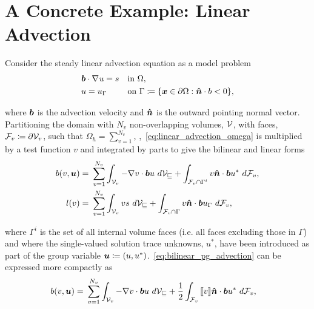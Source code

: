 \section{A Concrete Example: Linear Advection}

Consider the steady linear advection equation as a model problem
\begin{subequations}
\begin{align}
& \varv{b} \cdot \nabla \vars{u} = s && \text{in}\ \Omega, \label{eq:linear_advection_omega} \\
& u = u_{\Gamma}\ && \text{on}\ \Gamma \coloneqq \{ \varv{x} \in \partial\Omega : \varv{\hat{n}} \cdot b < 0 \},
\end{align}
\end{subequations}

where $\mathit{\bm{{b}}}$ is the advection velocity and $\mathit{\bm{{\hat{n}}}}$ is the outward pointing normal vector. Partitioning the
domain with $N_v$ non-overlapping volumes, $\mathcal{{{V}}}$, with faces, $\mathcal{{{F}}}_v \coloneqq \partial \mathcal{{{V}}}_v$, such that
$\Omega_h = \sum_{v=1}^{N_v}$, ,~\eqref{eq:linear_advection_omega} is multiplied
by a test function $v$ and integrated by parts to give the bilinear and linear forms
\begin{subequations} \label{eq:variational_form_advection}
\begin{align}
b(v,\varg{u}) 
=\ & \sum_{v=1}^{N_v} \int_{\fe{V}_v} - \nabla v \cdot \varv{b} u\ d\fe{V_v} + \int_{\fe{F}_v \cap \Gamma^i} v
\varv{\hat{n}} \cdot \varv{b} u^*\ d\fe{F}_v, \label{eq:bilinear_pg_advection}\\
l(v)
=\ & \sum_{v=1}^{N_v} \int_{\fe{V}_v} v s\ d\fe{V_v} + \int_{\fe{F}_v \cap \Gamma} v \varv{\hat{n}} \cdot \varv{b}
u_{\Gamma}\ d\fe{F}_v,
\end{align}
\end{subequations}

where $\Gamma^i$ is the set of all internal volume faces (i.e. all faces excluding those in $\Gamma$) and where the
single-valued solution trace unknowns, $u^*$, have been introduced as part of the group variable $\mathit{\bm{{u}}} \coloneqq
(u,u^*)$.~\eqref{eq:bilinear_pg_advection} can be expressed more compactly as
\begin{align} \label{eq:bilinear_pg_advection_jump}
b(v,\varg{u}) 
=\ & \sum_{v=1}^{N_v} \int_{\fe{V}_v} - \nabla v \cdot \varv{b} u\ d\fe{V_v}
+ \frac{1}{2} \int_{\fe{F}_v} \jump{v} \varv{\hat{n}} \cdot \varv{b} u^*\ d\fe{F}_v,
\end{align}

